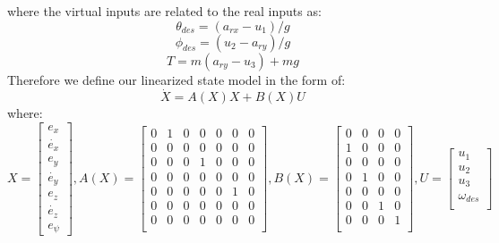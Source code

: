 \documentclass[conf]{new-aiaa}
\begin{document}
where the virtual inputs are related to the real inputs as:
\begin{equation}
\theta_{des} = (a_{rx}-u_{1})/g
\end{equation}
\begin{equation}
\phi_{des} = (u_{2}-a_{ry})/g
\end{equation}
\begin{equation}
T = m(a_{ry}-u_{3})+mg
\end{equation}
Therefore we define our linearized state model in the form of:
\begin{equation}\label{eq:linear}
\dot{X} = A(X)X + B(X)U
\end{equation}
where:
\begin{equation}
X = \begin{bmatrix}
e_{x}\\
\dot{e_{x}}\\
e_{y}\\
\dot{e_{y}}\\
e_{z}\\
\dot{e_{z}}\\
e_{\psi}
\end{bmatrix}, 
A(X) = \begin{bmatrix}
0 & 1 & 0 & 0 & 0 & 0 & 0\\
0 & 0 & 0 & 0 & 0 & 0 & 0\\
0 & 0 & 0 & 1 & 0 & 0 & 0\\
0 & 0 & 0 & 0 & 0 & 0 & 0\\
0 & 0 & 0 & 0 & 0 & 1 & 0\\
0 & 0 & 0 & 0 & 0 & 0 & 0\\
0 & 0 & 0 & 0 & 0 & 0 & 0\\
\end{bmatrix},
B(X) = \begin{bmatrix}
0 & 0 & 0 & 0\\
1 & 0 & 0 & 0\\
0 & 0 & 0 & 0\\
0 & 1 & 0 & 0\\
0 & 0 & 0 & 0\\
0 & 0 & 1 & 0\\
0 & 0 & 0 & 1\\
\end{bmatrix},
U = \begin{bmatrix}
u_{1}\\
u_{2}\\
u_{3}\\
\omega_{des}\\
\end{bmatrix}
\end{equation}
\end{document}
